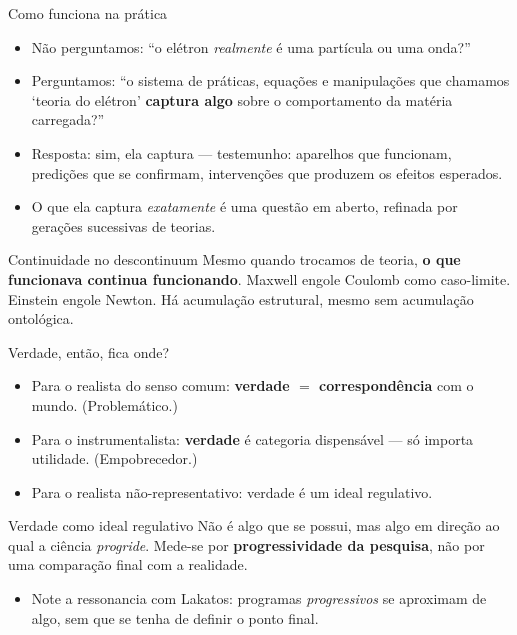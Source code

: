 \documentclass[aspectratio=169]{beamer}
\newcommand{\impt}[1]{\textcolor{maccent}{\textbf{#1}}}
\newcommand{\ntc}[1]{\textcolor{mprimary}{#1}}
\begin{document}
\begin{frame}{Como funciona na pr\'atica}
\begin{itemize}
    \item N\~ao perguntamos: ``o el\'etron \emph{realmente} \'e uma part\'icula ou uma onda?''
    \item Perguntamos: ``o sistema de pr\'aticas, equa\c c\~oes e manipula\c c\~oes que chamamos `teoria do el\'etron' \impt{captura algo} sobre o comportamento da mat\'eria carregada?''
\end{itemize}
\vspace{0.3cm}
\begin{itemize}
    \item Resposta: sim, ela captura --- testemunho: aparelhos que funcionam, predi\c c\~oes que se confirmam, interven\c c\~oes que produzem os efeitos esperados.
    \item O que ela captura \emph{exatamente} \'e uma quest\~ao em aberto, refinada por gera\c c\~oes sucessivas de teorias.
\end{itemize}
\vspace{0.4cm}
\begin{alertblock}{Continuidade no descontinuum}
Mesmo quando trocamos de teoria, \impt{o que funcionava continua funcionando}. Maxwell engole Coulomb como caso-limite. Einstein engole Newton. H\'a acumula\c c\~ao estrutural, mesmo sem acumula\c c\~ao ontol\'ogica.
\end{alertblock}
\end{frame}

\begin{frame}{Verdade, ent\~ao, fica onde?}
\begin{itemize}
    \item Para o realista do senso comum: \impt{verdade $=$ correspond\^encia} com o mundo. (Problem\'atico.)
    \item Para o instrumentalista: \impt{verdade} \'e categoria dispens\'avel --- s\'o importa utilidade. (Empobrecedor.)
    \item Para o realista n\~ao-representativo: verdade \'e \ntc{um ideal regulativo}.
\end{itemize}
\vspace{0.3cm}
\begin{block}{Verdade como ideal regulativo}
N\~ao \'e algo que se possui, mas algo em dire\c c\~ao ao qual a ci\^encia \emph{progride}. Mede-se por \impt{progressividade da pesquisa}, n\~ao por uma compara\c c\~ao final com a realidade.
\end{block}
\vspace{0.3cm}
\begin{itemize}
    \item Note a ressonancia com Lakatos: programas \emph{progressivos} se aproximam de algo, sem que se tenha de definir o ponto final.
\end{itemize}
\end{frame}
\end{document}
